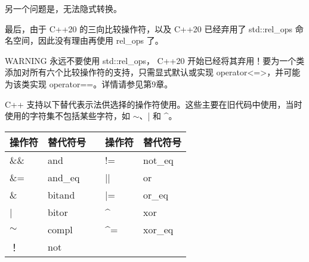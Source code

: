 另一个问题是，无法隐式转换。

最后，由于 C++20 的三向比较操作符，以及 C++20 已经弃用了 std::rel\_ops 命名空间，因此没有理由再使用 rel\_ops 了。

\begin{myWarning}{WARNING}
永远不要使用 std::rel\_ops， C++20 开始已经将其弃用！要为一个类添加对所有六个比较操作符的支持，只需显式默认或实现 operator<=>，并可能为该类实现 operator==。详情请参见第9章。
\end{myWarning}


C++ 支持以下替代表示法供选择的操作符使用。这些主要在旧代码中使用，当时使用的字符集不包括某些字符，如 $\sim$、| 和 \^{}。

\begin{longtable}{|l|l|l|l|l|}
\hline
\textbf{操作符} & \textbf{替代符号} && \textbf{操作符} & \textbf{替代符号} \\ \hline
\endfirsthead
%
\endhead
%
\&\&   & and     && !=                  & not\_eq \\ \hline
\&=    & and\_eq && ||                  & or      \\ \hline
\&     & bitand  && |=                  & or\_eq  \\ \hline
|      & bitor   && \textasciicircum{}  & xor     \\ \hline
$\sim$ & compl   && \textasciicircum{}= & xor\_eq \\ \hline
！     & not     &&                     &         \\ \hline
\end{longtable}



